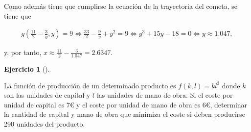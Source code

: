 \documentclass[
  a4paper,
]{scrreport}
\theoremstyle{definition}
\newtheorem{exercise}{Ejercicio}[chapter]
\theoremstyle{remark}
\begin{document}
\begin{tcolorbox}
Como además tiene que cumplirse la ecuación de la trayectoria del
cometa, se tiene que

\[
\begin{gathered}
g\left(\frac{11}{2}-\frac{3}{y},y\right) = 9 
\Leftrightarrow \frac{33}{2}-\frac{9}{y}+y^2 = 9
\Leftrightarrow y^3+15y-18 = 0 
\Leftrightarrow y \approx 1.047,
\end{gathered}
\]

y, por tanto, \(x\approx \frac{11}{2}-\frac{3}{1.047}= 2.6347.\)

\end{tcolorbox}

\begin{exercise}[]\protect\hypertarget{exr-minimizacion-coste-production}{}\label{exr-minimizacion-coste-production}

La función de producción de un determinado producto es \(f(k,l)= kl^3\)
donde \(k\) son las unidades de capital y \(l\) las unidades de mano de
obra. Si el coste por unidad de capital es 7€ y el coste por unidad de
mano de obra es 6€, determinar la cantidad de capital y mano de obra que
minimiza el coste si deben producirse 290 unidades del producto.

\end{exercise}
\end{document}
